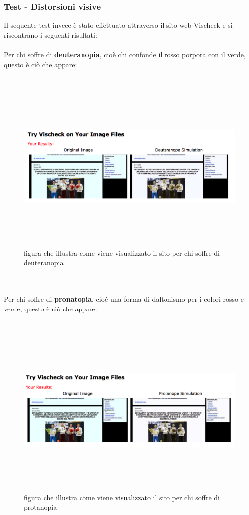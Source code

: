 	\subsubsection {Test - Distorsioni visive}
	Il sequente test invece \`e  stato effettuato attraverso il sito web Vischeck e si riscontrano i seguenti risultati:
	\\
	\\ Per chi soffre di \textbf{deuteranopia}, cio\`e chi confonde il rosso porpora con il verde, questo \`e ci\`o che appare:
	\\
	\\ 
	\begin{figure}[htbp]
		\centering
		\includegraphics[width=150mm, height=85mm]{images/contrasto_pagina_deuteranope.png}
		\caption{figura che illustra come viene visualizzato il sito per chi soffre di deuteranopia}
	\end{figure}	
	\\
	\\ Per chi soffre di \textbf{pronatopia}, cio\'e una forma di daltonismo per i colori rosso e verde,  questo \`e ci\`o che appare:
	\\
	\\ 
	\begin{figure}[htbp]
		\centering
		\includegraphics[width=150mm, height=85mm]{images/contrasto_pagina_protanope.png}
		\caption{figura che illustra come viene visualizzato il sito per chi soffre di protanopia}
	\end{figure}
